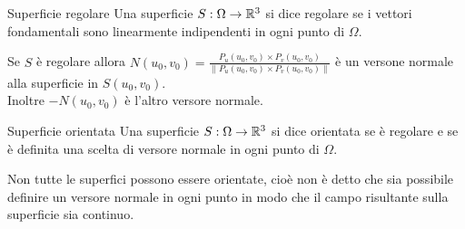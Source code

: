 \begin{definizione}{Superficie regolare}
  Una superficie $S:\Omega\to\mathbb{R}^3$ si dice regolare se i vettori fondamentali sono linearmente indipendenti in ogni punto di $\Omega$.
\end{definizione}

\begin{osservazione}{}
  Se $S$ è regolare allora $N(u_0,v_0) = \frac{P_u(u_0,v_0)\times P_v(u_0,v_0)}{\|P_u(u_0,v_0)\times P_v(u_0,v_0)\|}$ è un versone normale alla superficie in $S(u_0,v_0)$.\\
  Inoltre $-N(u_0,v_0)$ è l'altro versore normale.
\end{osservazione}

\begin{definizione}{Superficie orientata}
  Una superficie $S:\Omega\to\mathbb{R}^3$ si dice orientata se è regolare e se è definita una scelta di versore normale in ogni punto di $\Omega$.
\end{definizione}

\begin{osservazione}{}
  Non tutte le superfici possono essere orientate, cioè non è detto che sia possibile definire un versore normale in ogni punto in modo che il campo risultante sulla superficie sia continuo.
\end{osservazione}

